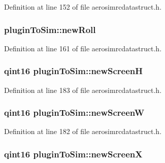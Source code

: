 Definition at line 152 of file aerosimrcdatastruct.\-h.

\hypertarget{group___aero_sim_r_c_ga83b167dd0c9161f47923432618fac9c4}{
\subsubsection[{new\-Roll}]{ plugin\-To\-Sim\-::new\-Roll}}\label{group___aero_sim_r_c_ga83b167dd0c9161f47923432618fac9c4}


Definition at line 161 of file aerosimrcdatastruct.\-h.

\hypertarget{group___aero_sim_r_c_ga6ac6931958ba1a74ff06dbfe7dba5676}{
\subsubsection[{new\-Screen\-H}]{\setlength{\rightskip}{0pt plus 5cm}qint16 plugin\-To\-Sim\-::new\-Screen\-H}}\label{group___aero_sim_r_c_ga6ac6931958ba1a74ff06dbfe7dba5676}


Definition at line 183 of file aerosimrcdatastruct.\-h.

\hypertarget{group___aero_sim_r_c_ga73893f1a06af3481486ee34ef91001c0}{
\subsubsection[{new\-Screen\-W}]{\setlength{\rightskip}{0pt plus 5cm}qint16 plugin\-To\-Sim\-::new\-Screen\-W}}\label{group___aero_sim_r_c_ga73893f1a06af3481486ee34ef91001c0}


Definition at line 182 of file aerosimrcdatastruct.\-h.

\hypertarget{group___aero_sim_r_c_gacb23e684331322adcce5771dc717ea18}{
\subsubsection[{new\-Screen\-X}]{\setlength{\rightskip}{0pt plus 5cm}qint16 plugin\-To\-Sim\-::new\-Screen\-X}}\label{group___aero_sim_r_c_gacb23e684331322adcce5771dc717ea18}


